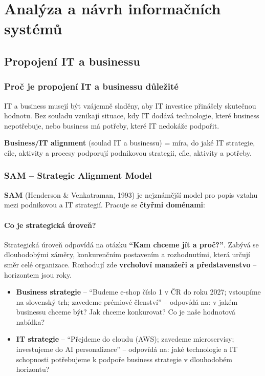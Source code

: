 \section{Analýza a návrh informačních systémů}

\subsection{Propojení IT a businessu}

\subsubsection{Proč je propojení IT a businessu důležité}

IT a business musejí být vzájemně sladěny, aby IT investice přinášely skutečnou hodnotu.
Bez souladu vznikají situace, kdy IT dodává technologie, které business nepotřebuje,
nebo business má potřeby, které IT nedokáže podpořit.

\textbf{Business/IT alignment} (soulad IT a businessu) = míra, do jaké IT strategie, cíle, aktivity
a procesy podporují podnikovou strategii, cíle, aktivity a potřeby.

\subsubsection{SAM -- Strategic Alignment Model}

\textbf{SAM} (Henderson \& Venkatraman, 1993) je nejznámější model pro popis vztahu mezi
podnikovou a IT strategií. Pracuje se \textbf{čtyřmi doménami}:

\paragraph{Co je strategická úroveň?}
Strategická úroveň odpovídá na otázku \textbf{``Kam chceme jít a proč?''}.
Zabývá se dlouhodobými záměry, konkurenčním postavením a rozhodnutími, která určují směr celé organizace.
Rozhodují zde \textbf{vrcholoví manažeři a představenstvo} -- horizontem jsou roky.

\begin{itemize}
  \item \textbf{Business strategie} -- ``Budeme e-shop číslo 1 v ČR do roku 2027; vstoupíme na slovenský trh;
    zavedeme prémiové členství'' -- odpovídá na: v jakém businessu chceme být? Jak chceme
    konkurovat? Co je naše hodnotová nabídka?
  \item \textbf{IT strategie} -- ``Přejdeme do cloudu (AWS); zavedeme microservisy; investujeme do AI
    personalizace'' -- odpovídá na: jaké technologie a IT schopnosti potřebujeme k podpoře
    business strategie v dlouhodobém horizontu?
\end{itemize}

